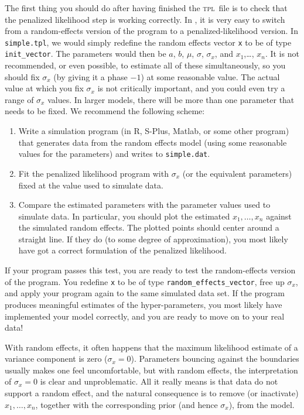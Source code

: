 \documentclass{admbmanual}
\begin{document}
The first thing you should do after having finished the \textsc{tpl}~file is to
check that the penalized likelihood step is working correctly. In \scAB, it is
very easy to switch from a random-effects version of the program to a
penalized-likelihood version. In \texttt{simple.tpl}, we would simply redefine
the random effects vector \texttt{x} to be of type \texttt{init\_vector}. The
parameters would then be $a$, $b$, $\mu $, $\sigma $, $\sigma_x$, and
$x_1$,\ldots, $x_n$. It is not recommended, or even possible, to estimate
all of these simultaneously, so you should fix $\sigma_x$ (by giving it a
phase $-1$) at some reasonable value. The actual value at which you
fix $\sigma_x$ is not critically important, and you could even try a range of
$\sigma_x$ values. In larger models, there will be more than one parameter
that needs to be fixed. We recommend the following scheme:
\begin{enumerate}
  \item Write a simulation program (in R, S-Plus, Matlab, or some other
  program) that generates data from the random effects model (using some
  reasonable values for the parameters) and writes to \texttt{simple.dat}.

  \item Fit the penalized likelihood program with $\sigma_x$ (or the
  equivalent parameters) fixed at the value used to simulate data.

  \item Compare the estimated parameters with the parameter values used to
  simulate data. In particular, you should plot the estimated $x_1,\ldots,x_n$
  against the simulated random effects. The plotted points should center
  around a straight line. If they do (to some degree of approximation), you
  most likely have got a correct formulation of the penalized likelihood.
\end{enumerate}
If your program passes this test, you are ready to test the random-effects
version of the program. You redefine \texttt{x} to be of type
\texttt{random\_effects\_vector}, free up $\sigma_x$, and apply your program
again to the same simulated data set. If the program produces meaningful
estimates of the hyper-parameters, you most likely have implemented your model
correctly, and you are ready to move on to your real data!

With random effects, it often happens that the maximum likelihood estimate of a
variance component is zero ($\sigma_x=0$). Parameters bouncing against the
boundaries usually makes one feel uncomfortable, but with random effects, the
interpretation of $\sigma_x=0$ is clear and unproblematic. All it really means
is that data do not support a random effect, and the natural consequence is to
remove (or inactivate) $x_1,\ldots,x_n$, together with the corresponding
prior (and hence $\sigma_x$), from the model.
\end{document}

